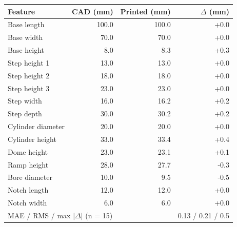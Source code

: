\begin{tabular}{lrrr}
\toprule
Feature & CAD (mm) & Printed (mm) & $\Delta$ (mm) \\
\midrule
Base length & 100.0 & 100.0 & +0.0 \\
Base width & 70.0 & 70.0 & +0.0 \\
Base height & 8.0 & 8.3 & +0.3 \\
Step height 1 & 13.0 & 13.0 & +0.0 \\
Step height 2 & 18.0 & 18.0 & +0.0 \\
Step height 3 & 23.0 & 23.0 & +0.0 \\
Step width & 16.0 & 16.2 & +0.2 \\
Step depth & 30.0 & 30.2 & +0.2 \\
Cylinder diameter & 20.0 & 20.0 & +0.0 \\
Cylinder height & 33.0 & 33.4 & +0.4 \\
Dome height & 23.0 & 23.1 & +0.1 \\
Ramp height & 28.0 & 27.7 & -0.3 \\
Bore diameter & 10.0 & 9.5 & -0.5 \\
Notch length & 12.0 & 12.0 & +0.0 \\
Notch width & 6.0 & 6.0 & +0.0 \\
\midrule
\multicolumn{3}{l}{MAE / RMS / max $|\Delta|$ (n = 15)} & 0.13 / 0.21 / 0.5 \\
\bottomrule
\end{tabular}
